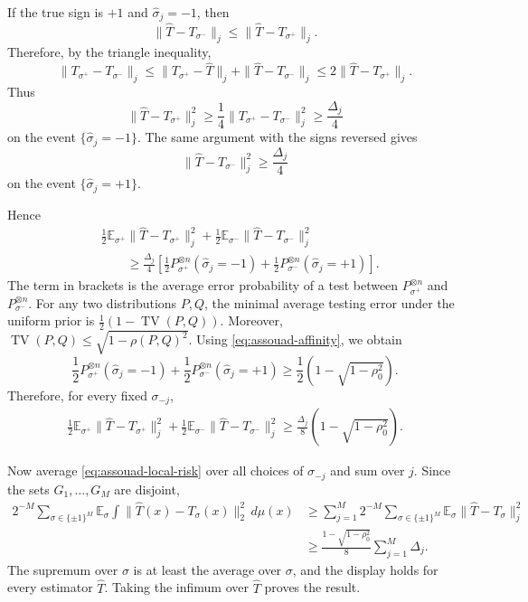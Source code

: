 \documentclass[11pt,twoside]{article}
\DeclareMathOperator{\TV}{TV}
\begin{document}
If the true sign is $+1$ and $\widehat \sigma_j=-1$, then
\[
\|\widehat T-T_{\sigma^-}\|_j
\leq
\|\widehat T-T_{\sigma^+}\|_j .
\]
Therefore, by the triangle inequality,
\[
\|T_{\sigma^+}-T_{\sigma^-}\|_j
\leq
\|T_{\sigma^+}-\widehat T\|_j
+
\|\widehat T-T_{\sigma^-}\|_j
\leq
2\|\widehat T-T_{\sigma^+}\|_j .
\]
Thus
\[
\|\widehat T-T_{\sigma^+}\|_j^2
\geq
\frac14
\|T_{\sigma^+}-T_{\sigma^-}\|_j^2
\geq
\frac{\Delta_j}{4}
\]
on the event $\{\widehat\sigma_j=-1\}$. The same argument with the signs
reversed gives
\[
\|\widehat T-T_{\sigma^-}\|_j^2
\geq
\frac{\Delta_j}{4}
\]
on the event $\{\widehat\sigma_j=+1\}$.

Hence
\begin{align*}
&\frac12
\mathbb E_{\sigma^+}
\|\widehat T-T_{\sigma^+}\|_j^2
+
\frac12
\mathbb E_{\sigma^-}
\|\widehat T-T_{\sigma^-}\|_j^2  \\
&\qquad\geq
\frac{\Delta_j}{4}
\left[
\frac12 P_{\sigma^+}^{\otimes n}(\widehat\sigma_j=-1)
+
\frac12 P_{\sigma^-}^{\otimes n}(\widehat\sigma_j=+1)
\right].
\end{align*}
The term in brackets is the average error probability of a test between
$P_{\sigma^+}^{\otimes n}$ and $P_{\sigma^-}^{\otimes n}$. For any two distributions $P,Q$,
the minimal average testing error under the uniform prior is $\frac12(1-\TV(P,Q)).$
Moreover, $\TV(P,Q)\leq \sqrt{1-\rho(P,Q)^2}.$
Using \eqref{eq:assouad-affinity}, we obtain
\[
\frac12 P^{\otimes n}_{\sigma^+}(\widehat\sigma_j=-1)
+
\frac12 P^{\otimes n}_{\sigma^-}(\widehat\sigma_j=+1)
\geq
\frac12\left(1-\sqrt{1-\rho_0^2}\right).
\]
Therefore, for every fixed $\sigma_{-j}$,
\begin{align}
\label{eq:assouad-local-risk}
\frac12
\mathbb E_{\sigma^+}
\|\widehat T-T_{\sigma^+}\|_j^2
+
\frac12
\mathbb E_{\sigma^-}
\|\widehat T-T_{\sigma^-}\|_j^2
\geq
\frac{\Delta_j}{8}
\left(1-\sqrt{1-\rho_0^2}\right).
\end{align}

Now average \eqref{eq:assouad-local-risk} over all choices of
$\sigma_{-j}$ and sum over $j$. Since the sets $G_1,\ldots,G_M$ are
disjoint,
\begin{align*}
2^{-M}
\sum_{\sigma\in\{\pm1\}^M}
\mathbb E_\sigma
\int
\|\widehat T(x)-T_\sigma(x)\|_2^2\,d\mu(x)
&\geq
\sum_{j=1}^M
2^{-M}
\sum_{\sigma\in\{\pm1\}^M}
\mathbb E_\sigma
\|\widehat T-T_\sigma\|_j^2 \\
&\geq
\frac{1-\sqrt{1-\rho_0^2}}{8}
\sum_{j=1}^M \Delta_j .
\end{align*}
The supremum over $\sigma$ is at least the average over $\sigma$, and the
display holds for every estimator $\widehat T$. Taking the infimum over
$\widehat T$ proves the result.
\end{document}
